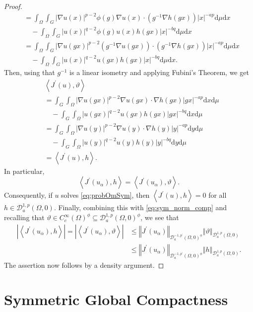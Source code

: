 \documentclass[10pt, reqno]{amsart}
\newcommand{\Om}{\Omega}
\newcommand{\abs}[1]{\left\vert #1 \right\vert}
\newcommand{\norm}[1]{\left\Vert #1 \right\Vert}
\newcommand{\inner}[1]{\left\langle#1\right\rangle}
\newcommand{\D}{\mathcal{D}}
\renewcommand{\d}{\mathrm{d}}
\numberwithin{equation}{section}
\theoremstyle{definition}
\theoremstyle{remark}
\theoremstyle{plain}
\begin{document}
\begin{proof}
\[\begin{aligned}
			&= \int_{\Om} \int_G\abs{\nabla u(x)}^{p-2}\phi(g)\nabla u(x) \cdot (g^{-1}\nabla h(gx)) \abs{x}^{-ap} \d\mu\d{x} \\
			&\quad - \int_\Om \int_G\abs{u(x)}^{q-2}\phi(g)u(x)h(gx)\abs{x}^{-bq}\d\mu \d{x}\\
			&= \int_{\Om} \int_G\abs{\nabla u(gx)}^{p-2}(g^{-1}\nabla u(gx)) \cdot (g^{-1}\nabla h(gx))\abs{x}^{-ap}\d\mu \d{x} \\
			&\quad - \int_\Om \int_G\abs{u(x)}^{q-2}u(gx)h(gx)\abs{x}^{-bq}\d\mu \d{x}.
		\end{aligned}
		\]
		Then, using that $g^{-1}$ is a linear isometry and applying Fubini's Theorem, we get
		\[
		\begin{aligned}
			&\inner{J^\prime(u), \vartheta}\\
			&= \int_G\int_{\Om} \abs{\nabla u(gx)}^{p-2}\nabla u(gx) \cdot \nabla h(gx) \abs{gx}^{-ap}\d{x}\d\mu \\
			&\quad - \int_G\int_{\Om} \abs{u(gx)}^{q-2}u(gx)h(gx) \abs{gx}^{-bq}\d{x}\d\mu\\
			&= \int_G\int_{\Om} \abs{\nabla u(y)}^{p-2}\nabla u(y) \cdot \nabla h(y) \abs{y}^{-ap}\d{y}\d\mu \\
			&\quad - \int_G\int_{\Om} \abs{u(y)}^{q-2}u(y)h(y) \abs{y}^{-bq}\d{y}\d\mu\\
			&=\inner{J^\prime(u), h}.
		\end{aligned}
		\]
		In particular,
		\[
		\inner{J^\prime(u_\alpha), h} = \inner{J^\prime(u_\alpha), \vartheta}.
		\]
		Consequently, if $u$ solves \eqref{eq:probOmSym}, then $\inner{J^\prime(u),h} = 0$ for all $h \in \D_a^{1,p}(\Om,0)$.
		Finally, combining this with \eqref{eq:sym_norm_comp} and recalling that $\vartheta \in C_c^\infty(\Om)^\phi \subseteq \D_a^{1,p}(\Om ,0)^\phi$, we see that
		\[
		\begin{aligned}
			\abs{\inner{J^\prime(u_\alpha), h}} 
			= \abs{\inner{J^\prime(u_\alpha), \vartheta}} 
			&\le \norm{J^\prime(u_\alpha)}_{\D_a^{-1, p^\prime}(\Om, 0)^\phi}\norm{\vartheta}_{\D_a^{1,p}(\Om,0)}\\
			&\le \norm{J^\prime(u_\alpha)}_{\D_a^{-1, p^\prime}(\Om, 0)^\phi}\norm{h}_{\D_a^{1,p}(\Om, 0)}.
		\end{aligned}
		\]
		The assertion now follows by a density argument. 
	\end{proof}
	
	
	\section{Symmetric Global Compactness}
	
\end{document}
